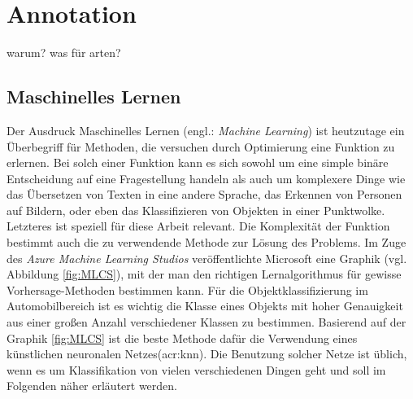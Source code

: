 \graphicspath{{Kapitel/Kapitel3_Grundlagen/Images/}}


\section{Annotation}
warum?
was für arten?

\subsection{Maschinelles Lernen}
\label{sec:MLearning}
Der Ausdruck Maschinelles Lernen (engl.: \textit{Machine Learning}) ist heutzutage ein Überbegriff für Methoden, die versuchen durch Optimierung eine Funktion zu erlernen. Bei solch einer Funktion kann es sich sowohl um eine simple binäre Entscheidung auf eine Fragestellung handeln als auch um komplexere Dinge wie das Übersetzen von Texten in eine andere Sprache, das Erkennen von Personen auf Bildern, oder eben das Klassifizieren von Objekten in einer Punktwolke. Letzteres ist speziell für diese Arbeit relevant. Die Komplexität der Funktion bestimmt auch die zu verwendende Methode zur Lösung des Problems. Im Zuge des \textit{Azure Machine Learning Studios} veröffentlichte Microsoft eine Graphik (vgl. Abbildung \ref{fig:MLCS}), mit der man den richtigen Lernalgorithmus für gewisse Vorhersage-Methoden bestimmen kann. Für die Objektklassifizierung im Automobilbereich ist es wichtig die Klasse eines Objekts mit hoher Genauigkeit aus einer großen Anzahl verschiedener Klassen zu bestimmen. Basierend auf der Graphik \ref{fig:MLCS} ist die beste Methode dafür die Verwendung eines künstlichen neuronalen Netzes(\acrshort{acr:knn}). Die Benutzung solcher Netze ist üblich, wenn es um Klassifikation von vielen verschiedenen Dingen geht und soll im Folgenden näher erläutert werden.\\


